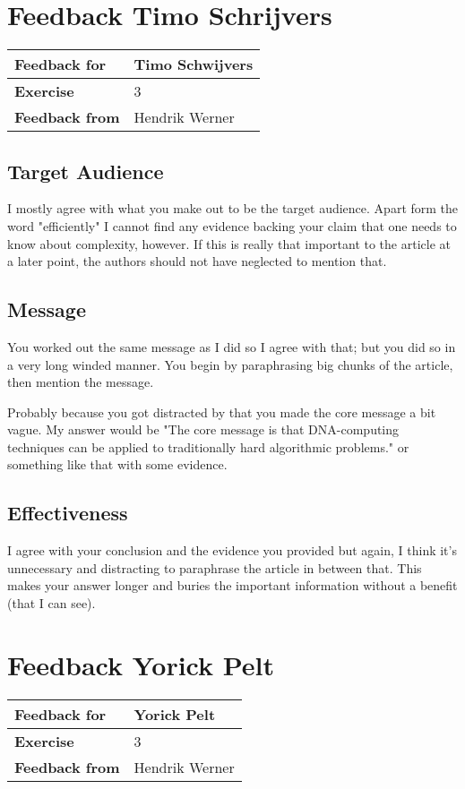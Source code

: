 \documentclass[12pt, a4paper]{article}
\begin{document}
\clearpage
\section{Feedback Timo Schrijvers}
\begin{tabular}{|l|l|}
	\hline
	\textbf{Feedback for} & Timo Schwijvers\\\hline
	\textbf{Exercise} & 3\\\hline
	\textbf{Feedback from} & Hendrik Werner\\\hline
\end{tabular}

\subsection{Target Audience}
I mostly agree with what you make out to be the target audience. Apart form the word "efficiently" I cannot find any evidence backing your claim that one needs to know about complexity, however. If this is really that important to the article at a later point, the authors should not have neglected to mention that.

\subsection{Message}
You worked out the same message as I did so I agree with that; but you did so in a very long winded manner. You begin by paraphrasing big chunks of the article, then mention the message.

Probably because you got distracted by that you made the core message a bit vague. My answer would be "The core message is that DNA-computing techniques can be applied to traditionally hard algorithmic problems." or something like that with some evidence.

\subsection{Effectiveness}
I agree with your conclusion and the evidence you provided but again, I think it's unnecessary and distracting to paraphrase the article in between that. This makes your answer longer and buries the important information without a benefit (that I can see).

\clearpage
\section{Feedback Yorick Pelt}
\begin{tabular}{|l|l|}
	\hline
	\textbf{Feedback for} & Yorick Pelt\\\hline
	\textbf{Exercise} & 3\\\hline
	\textbf{Feedback from} & Hendrik Werner\\\hline
\end{tabular}
\end{document}
